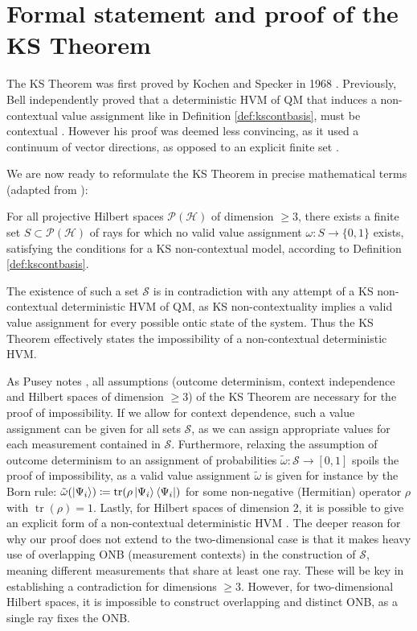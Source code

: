 \section{Formal statement and proof of the KS Theorem}
\label{sec:formalproof}

The KS Theorem was first proved by Kochen and Specker in 1968 \cite{Kochen1968}. Previously, Bell independently proved that a deterministic HVM of QM that induces a non-contextual value assignment like in Definition \ref{def:kscontbasis}, must be contextual \cite{Bell1966}. However his proof was deemed less convincing, as it used a continuum of vector directions, as opposed to an explicit finite set \cite{Mermin1993}.

We are now ready to reformulate the KS Theorem in precise mathematical terms (adapted from \cite{Pusey2019}):

\begin{theorem}\hfill\break
\label{thm:ksthm}
For all projective Hilbert spaces $\mathcal{P}(\mathcal{H})$ of dimension $\geq3$, there exists a finite set $S\subset\mathcal{P}(\mathcal{H})$ of rays for which no valid value assignment $\omega:S\rightarrow\{0,1\}$ exists, satisfying the conditions for a KS non-contextual model, according to Definition \ref{def:kscontbasis}.
\end{theorem}

The existence of such a set $\mathcal{S}$ is in contradiction with any attempt of a KS non-contextual deterministic HVM of QM, as KS non-contextuality implies a valid value assignment for every possible ontic state of the system. Thus the KS Theorem effectively states the impossibility of a non-contextual deterministic HVM. 

As Pusey notes \cite{Pusey2019}, all assumptions (outcome determinism, context independence and Hilbert spaces of dimension $\ge3$) of the KS Theorem are necessary for the proof of impossibility. If we allow for context dependence, such a value assignment can be given for all sets $\mathcal{S}$, as we can assign appropriate values for each measurement contained in $\mathcal{S}$. Furthermore, relaxing the assumption of outcome determinism to an assignment of probabilities $\tilde{\omega}:\mathcal{S}\rightarrow\left[0,1\right]$ spoils the proof of impossibility, as a valid value assignment $\tilde{\omega}$ is given for instance by the Born rule: $\tilde{\omega}(\ket{\Psi_{i}} )\coloneqq\operatorname{tr}(\rho\ket{\Psi_{i}} \bra{\Psi_{i}})$ for some non-negative (Hermitian) operator $\rho$ with $\operatorname{tr}(\rho)=1$. Lastly, for Hilbert spaces of dimension 2, it is possible to give an explicit form of a non-contextual deterministic HVM \cite{Mermin1993}. The deeper reason for why our proof does not extend to the two-dimensional case is that it makes heavy use of overlapping ONB (measurement contexts) in the construction of $\mathcal{S}$, meaning different measurements that share at least one ray. These will be key in establishing a contradiction for dimensions $\geq3$. However, for two-dimensional Hilbert spaces, it is impossible to construct overlapping and distinct ONB, as a single ray fixes the ONB.

